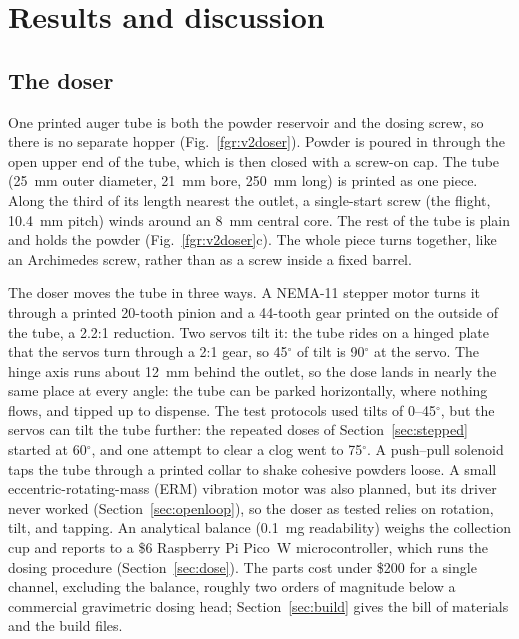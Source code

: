\documentclass[twoside,twocolumn,9pt]{article}
\begin{document}
\section{Results and discussion}

\subsection{The doser}
\label{sec:doser}

One printed auger tube is both the powder reservoir and the dosing screw, so there is no separate hopper (Fig.~\ref{fgr:v2doser}). Powder is poured in through the open upper end of the tube, which is then closed with a screw-on cap. The tube (25~mm outer diameter, 21~mm bore, 250~mm long) is printed as one piece. Along the third of its length nearest the outlet, a single-start screw (the flight, 10.4~mm pitch) winds around an 8~mm central core. The rest of the tube is plain and holds the powder (Fig.~\ref{fgr:v2doser}c). The whole piece turns together, like an Archimedes screw, rather than as a screw inside a fixed barrel.

The doser moves the tube in three ways. A NEMA-11 stepper motor turns it through a printed 20-tooth pinion and a 44-tooth gear printed on the outside of the tube, a 2.2:1 reduction. Two servos tilt it: the tube rides on a hinged plate that the servos turn through a 2:1 gear, so 45$^\circ$ of tilt is 90$^\circ$ at the servo. The hinge axis runs about 12~mm behind the outlet, so the dose lands in nearly the same place at every angle: the tube can be parked horizontally, where nothing flows, and tipped up to dispense. The test protocols used tilts of 0--45$^\circ$, but the servos can tilt the tube further: the repeated doses of Section~\ref{sec:stepped} started at 60$^\circ$, and one attempt to clear a clog went to 75$^\circ$. A push--pull solenoid taps the tube through a printed collar to shake cohesive powders loose. A small eccentric-rotating-mass (ERM) vibration motor was also planned, but its driver never worked (Section~\ref{sec:openloop}), so the doser as tested relies on rotation, tilt, and tapping. An analytical balance (0.1~mg readability) weighs the collection cup and reports to a \$6 Raspberry Pi Pico~W microcontroller, which runs the dosing procedure (Section~\ref{sec:dose}). The parts cost under \$200 for a single channel, excluding the balance, roughly two orders of magnitude below a commercial gravimetric dosing head; Section~\ref{sec:build} gives the bill of materials and the build files.
\end{document}
